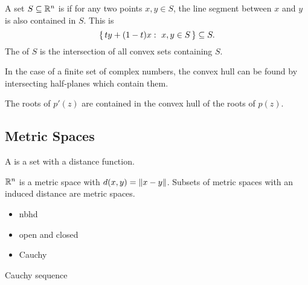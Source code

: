 \documentclass[12pt]{memoir}
\begin{document}
\begin{Def}
    A set $S\subseteq\mathbb{R}^n$ is  if for any two points $x,y\in S$, the line segment between $x$ and $y$ is also contained in $S$. This is 
    $$\{\,ty+(1-t)x:\ x,y\in S\,\}\subseteq S.$$
    The  of $S$ is the intersection of all convex sets containing $S$. 
\end{Def}

In the case of a finite set of complex numbers, the convex hull can be found by intersecting half-planes which contain them.

\begin{Cor}
The roots of $p'(z)$ are contained in the convex hull of the roots of $p(z)$. 
\end{Cor}

\subsection{Metric Spaces}

\begin{Def}
    A  is a set with a distance function.
\end{Def}

\begin{Ex}
    $\mathbb{R}^n$ is a metric space with $d(x,y)=\norm{x-y}$. Subsets of metric spaces with an induced distance are metric spaces. 
\end{Ex}

\begin{itemize}
    \item nbhd
    \item open and closed
    \item Cauchy
\end{itemize}

\begin{Def}
    Cauchy sequence
\end{Def}
\ifx\nextra\undefined
\printindex
\else\fi
\nocite{*}


\end{document}
